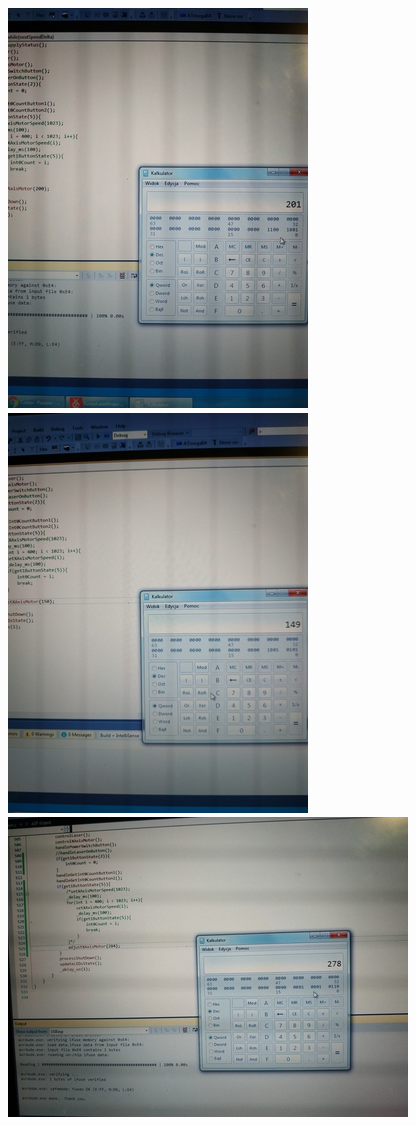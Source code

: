\documentclass[a4paper,oneside,11pt]{report}
\begin{document}
\begin{enumerate}[1.]
\includegraphics[scale=0.5]{images/8.jpg} 
\includegraphics[scale=0.5]{images/9.jpg} 
\includegraphics[scale=0.5]{images/10.jpg} 

\end{enumerate}
\end{document}
